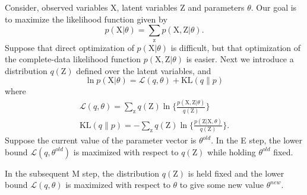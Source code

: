 \documentclass[a4paper]{book}
\newcommand{\mrm}{\mathrm}
\begin{document}
Consider, observed variables $\mrm X$, latent variables $\mrm Z$ and parameters $\theta$. Our goal is to maximize the likelihood function given by
\begin{equation}\label{}
  p(\mrm X|\theta)=\sum_{\mrm z}p(\mrm X,\mrm Z|\theta).
\end{equation}
Suppose that direct optimization of $p(\mrm X|\theta)$ is difficult, but that optimization of the complete-data likelihood function $p(\mrm X,\mrm Z|\theta)$ is easier. Next we introduce a distribution $q(\mrm Z)$ defined over the latent variables, and
\begin{equation}\label{}
  \ln p(\mrm X|\theta) = \mathcal L(q,\theta)+\mrm{KL}(q\|p)
\end{equation}
where
\begin{gather}\label{}
  \mathcal L(q,\theta) = \sum_{\mrm z}q(\mrm Z)\ln\{\frac{p(\mrm X,\mrm Z|\theta)}{q(\mrm Z)}\} \\
  \mrm {KL}(q\|p)=-\sum_{\mrm z}q(\mrm Z)\ln\{\frac{p(\mrm Z|\mrm X,\theta)}{q(\mrm Z)}\}.
\end{gather}
 Suppose the current value of the parameter vector is $\theta^{old}$. In the E step, the lower bound $\mathcal L(q,\theta^{old})$ is maximized with respect to $q(\mrm Z)$ while holding $\theta^{old}$ fixed.

 In the subsequent M step, the distribution $q(\mrm Z)$ is held fixed and the lower bound $\mathcal L(q, \theta)$ is maximized with respect to $\theta$ to give some new value $\theta^{new}$.
\end{document}
